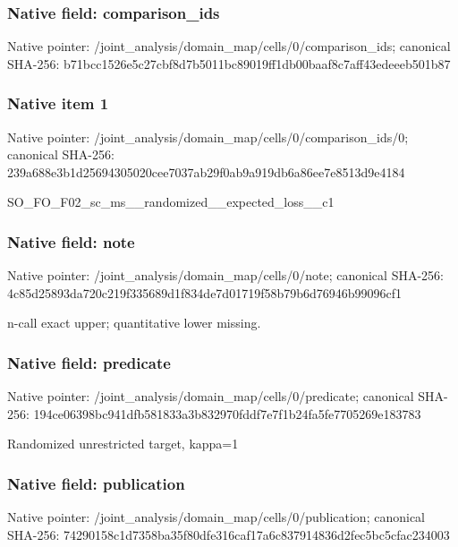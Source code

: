 \documentclass[10pt,a4paper]{article}
\begin{document}
\subsubsection{Native field: comparison\_\allowbreak{}ids}
Native pointer: /joint\_\allowbreak{}analysis/domain\_\allowbreak{}map/cells/0/comparison\_\allowbreak{}ids; canonical SHA-256: b71bcc1526e5c27cbf8d7b5011bc89019ff1db00baaf8c7aff43edeeeb501b87

\subsubsection{Native item 1}
Native pointer: /joint\_\allowbreak{}analysis/domain\_\allowbreak{}map/cells/0/comparison\_\allowbreak{}ids/0; canonical SHA-256: 239a688e3b1d25694305020cee7037ab29f0ab9a919db6a86ee7e8513d9e4184

\begingroup\raggedright\sloppy SO\_\allowbreak{}FO\_\allowbreak{}F02\_\allowbreak{}sc\_\allowbreak{}ms\_\allowbreak{}\_\allowbreak{}randomized\_\allowbreak{}\_\allowbreak{}expected\_\allowbreak{}loss\_\allowbreak{}\_\allowbreak{}c1\par\endgroup

\subsubsection{Native field: note}
Native pointer: /joint\_\allowbreak{}analysis/domain\_\allowbreak{}map/cells/0/note; canonical SHA-256: 4c85d25893da720c219f335689d1f834de7d01719f58b79b6d76946b99096cf1

\begingroup\raggedright\sloppy n-call exact upper;\allowbreak{} quantitative lower missing.\par\endgroup

\subsubsection{Native field: predicate}
Native pointer: /joint\_\allowbreak{}analysis/domain\_\allowbreak{}map/cells/0/predicate; canonical SHA-256: 194ce06398bc941dfb581833a3b832970fddf7e7f1b24fa5fe7705269e183783

\begingroup\raggedright\sloppy Randomized unrestricted target,\allowbreak{} kappa=\allowbreak{}1\par\endgroup

\subsubsection{Native field: publication}
Native pointer: /joint\_\allowbreak{}analysis/domain\_\allowbreak{}map/cells/0/publication; canonical SHA-256: 74290158c1d7358ba35f80dfe316caf17a6c837914836d2fec5bc5cfac234003
\end{document}
